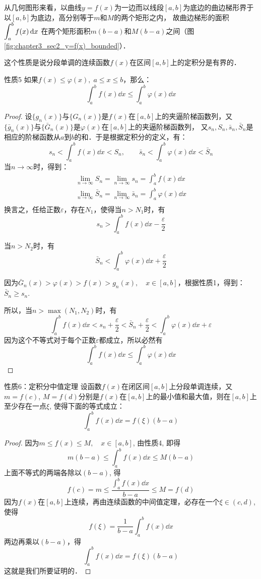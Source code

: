 从几何图形来看，以曲线$y=f(x)$为一边而以线段$[a,b]$为底边的曲边梯形界于以$[a,b]$为底边，高分别等于$m$和$M$的两个矩形之内，
故曲边梯形的面积$\displaystyle\int^b_a f(x)\,{\rm d} x$
在两个矩形面积$m(b-a)$和$M(b-a)$之间（图\ref{fig:chapter3_sec2_y=f(x)_bounded}）．

这个性质是说分段单调的连续函数$f(x)$在区间$[a,b]$上的定积分是有界的．

\begin{blk}{性质5}
如果$f(x)\le \varphi(x),\; a\le x\le b$，那么：
\[\int^b_a f(x)\dd x\le \int^b_a \varphi(x)\dd x\]
\end{blk}

\begin{proof}
    设$\{g_n(x)\}$与$\{G_n(x)\}$是$f(x)$在$[a,b]$上的夹逼阶梯函数列，又$\{\bar g_n(x)\}$与$\{\bar G_n(x)\}$是$\varphi(x)$在$[a,b]$上的夹逼阶梯函数列，
又$s_n, S_n, \bar s_n, \bar S_n$是相应的阶梯函数从$a$到$b$的和．于是根据定积分的定义，有：
\[s_n<\int^b_a f(x)\dd x<S_n,\qquad \bar s_n<\int^b_a \varphi(x)\dd x<\bar S_n\]
当$n\to\infty$时，得到：
\begin{align*}
\lim_{n\to\infty}S_n =\lim_{n\to\infty}s_n =\int^b_a f(x)\dd x\\
\lim_{n\to\infty}\bar S_n =\lim_{n\to\infty}\bar s_n =\int^b_a \varphi(x)\dd x\\
\end{align*}
换言之，任给正数$\varepsilon$，存在$N_1$，使得当$n>N_1$时，有
\[s_n>\int^b_a f(x)\dd x-\frac{\varepsilon}{2}\]

当$n>N_2$时，有
\[\bar S_n<\int^b_a \varphi(x)\dd x+\frac{\varepsilon}{2}\]

因为$\bar G_n(x)>\varphi(x)>f(x)>g_n(x),\quad x\in[a,b]$，根据性质1，得到：$\bar S_n\ge s_n$.

所以，当$n>\max(N_1,N_2)$时，有
\[\int^b_a f(x)\dd x<s_n+\frac{\varepsilon}{2}<\bar S_n+\frac{\varepsilon}{2}<\int^b_a \varphi(x)\dd x+\varepsilon\]
因为这个不等式对于每个正数$\varepsilon$都成立，所以必然有
\[\int^b_a f(x)\dd x\le \int^b_a \varphi(x)\dd x\]
\end{proof}

\begin{blk}{性质6：定积分中值定理}
   设函数$f(x)$在闭区间$[a,b]$上分段单调连续，又
$m=f(c)$, $M=f(d)$分别是$f(x)$在$[a,b]$上的最小值和最大值，则在$[a,b]$上至少存在一点$\xi$, 使得下面的等式成立：
\[\int^b_a f (x) \dd x=f(\xi) (b-a)\] 
\end{blk}

\begin{proof}
    因为$m\le f (x) \le M,\quad x\in [a,b]$, 
由性质4, 即得
\[m (b-a)\le \int^b_a f (x) \dd x\le M(b-a)\]
上面不等式的两端各除以$(b-a)$, 得
\[f(c)=m\le \frac{\int^b_a f (x) \dd x}{b-a}\le M=f(d)\]
因为$f(x)$在$[a,b]$上连续，再由连续函数的中间值定理，必存在一个$\xi\in(c,d)$, 使得
\[f(\xi)=\frac{1}{b-a}\int^b_a f (x) \dd x\]
两边再乘以$(b-a)$，得
\[\int^b_a f (x) \dd x=f(\xi)(b-a)\]
这就是我们所要证明的．
\end{proof}

